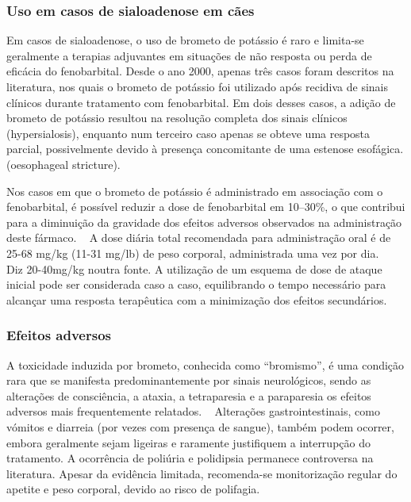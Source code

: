 \subsubsection{Uso em casos de sialoadenose em cães}


Em casos de sialoadenose, o uso de brometo de potássio é raro e limita-se geralmente a terapias adjuvantes em situações de não resposta ou perda de eficácia do fenobarbital. Desde o ano 2000, apenas três casos foram descritos na literatura, nos quais o brometo de potássio foi utilizado após recidiva de sinais clínicos durante tratamento com fenobarbital. Em dois desses casos, a adição de brometo de potássio resultou na resolução completa dos sinais clínicos (hypersialosis), enquanto num terceiro caso apenas se obteve uma resposta parcial, possivelmente devido à presença concomitante de uma estenose esofágica. (oesophageal stricture). 


Nos casos em que o brometo de potássio é administrado em associação com o fenobarbital, é possível reduzir a dose de fenobarbital em 10–30\%, o que contribui para a diminuição da gravidade dos efeitos adversos observados na administração deste fármaco. ~\cite{Gouveia2024} A dose diária total recomendada para administração oral é de 25-68 mg/kg (11-31 mg/lb) de peso corporal, administrada uma vez por dia. ~\cite{Fda2021} Diz 20-40mg/kg noutra fonte. A utilização de um esquema de dose de ataque inicial pode ser considerada caso a caso, equilibrando o tempo necessário para alcançar uma resposta terapêutica com a minimização dos efeitos secundários. ~\cite{Fda2021}


\subsubsection{Efeitos adversos}


A toxicidade induzida por brometo, conhecida como “bromismo”, é uma condição rara que se manifesta predominantemente por sinais neurológicos, sendo as alterações de consciência, a ataxia, a tetraparesia e a paraparesia os efeitos adversos mais frequentemente relatados. ~\cite{Fantinati2021} Alterações gastrointestinais, como vómitos e diarreia (por vezes com presença de sangue), também podem ocorrer, embora geralmente sejam ligeiras e raramente justifiquem a interrupção do tratamento. A ocorrência de poliúria e polidipsia permanece controversa na literatura. Apesar da evidência limitada, recomenda-se monitorização regular do apetite e peso corporal, devido ao risco de polifagia.


